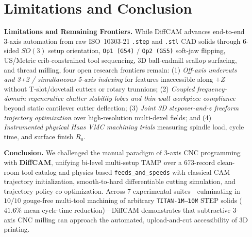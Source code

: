 \documentclass[conference]{IEEEtran}
\begin{document}
\section{Limitations and Conclusion}
\label{sec:conclusion}

\textbf{Limitations and Remaining Frontiers.}
While DiffCAM advances end-to-end 3-axis automation from raw ISO~10303-21 \texttt{.step} and \texttt{.stl} CAD solids through 6-sided $SO(3)$ setup orientation, \texttt{Op1 (G54)} / \texttt{Op2 (G55)} soft-jaw flipping, US/Metric crib-constrained tool sequencing, 3D ball-endmill scallop surfacing, and thread milling, four open research frontiers remain: (1) \emph{Off-axis undercuts and 3+2 / simultaneous 5-axis indexing} for features inaccessible along $\pm Z$ without T-slot/dovetail cutters or rotary trunnions; (2) \emph{Coupled frequency-domain regenerative chatter stability lobes and thin-wall workpiece compliance}~\cite{altintas2012manufacturing} beyond static cantilever cutter deflection; (3) \emph{Joint 3D stepover-and-$z$ freeform trajectory optimization} over high-resolution multi-dexel fields; and (4) \emph{Instrumented physical Haas VMC machining trials} measuring spindle load, cycle time, and surface finish $R_a$.

\textbf{Conclusion.}
We challenged the manual paradigm of 3-axis CNC programming with \textbf{DiffCAM}, unifying bi-level multi-setup TAMP over a 673-record clean-room tool catalog and physics-based \texttt{feeds\_and\_speeds} with classical CAM trajectory initialization, smooth-to-hard differentiable cutting simulation, and trajectory-policy co-optimization. Across 7 experimental suites—culminating in $10/10$ gouge-free multi-tool machining of arbitrary \texttt{TITAN-1M--10M} STEP solids ($41.6\%$ mean cycle-time reduction)—DiffCAM demonstrates that subtractive 3-axis CNC milling can approach the automated, upload-and-cut accessibility of 3D printing.


{\small
\setlength{\bibsep}{2.5pt}

}
\end{document}
